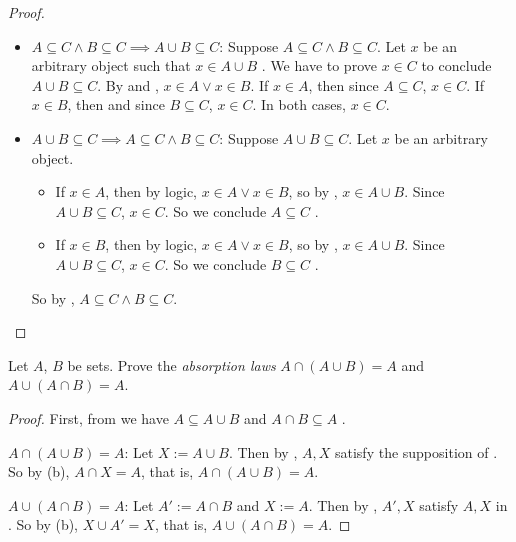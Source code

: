 \begin{proof}
\begin{itemize}
        \begin{itemize}
            \item \(A \subseteq C \land B \subseteq C \implies A \cup B \subseteq C\): Suppose \(A \subseteq C \land B \subseteq C\). Let \(x\) be an arbitrary object such that \(x \in A \cup B\) . We have to prove \(x \in C\) to conclude \(A \cup B \subseteq C\). By  and , \(x \in A \lor x \in B\). If \(x \in A\), then since \(A \subseteq C\), \(x \in C\). If \(x \in B\), then and since \(B \subseteq C\), \(x \in C\). In both cases, \(x \in C\).
            \item \(A \cup B \subseteq C \implies A \subseteq C \land B \subseteq C\): Suppose \(A \cup B \subseteq C\). Let \(x\) be an arbitrary object.
            \begin{itemize}
                \item If \(x \in A\), then by logic, \(x \in A \lor x \in B\), so by , \(x \in A \cup B\). Since \(A \cup B \subseteq C\), \(x \in C\). So we conclude \(A \subseteq C\) .
                \item If \(x \in B\), then by logic, \(x \in A \lor x \in B\), so by , \(x \in A \cup B\). Since \(A \cup B \subseteq C\), \(x \in C\). So we conclude \(B \subseteq C\) .
            \end{itemize}
            So by , \(A \subseteq C \land B \subseteq C\).
        \end{itemize}
\end{itemize}
\end{proof}

\begin{exercise}\label{exercise 3.1.8}
Let \(A\), \(B\) be sets. Prove the \emph{absorption laws} \(A \cap (A \cup B) = A\) and \(A \cup (A \cap B) = A\).
\end{exercise}

\begin{proof} First, from  we have \(A \subseteq A \cup B\)  and \(A \cap B \subseteq A\) .

\(A \cap (A \cup B) = A\): Let \(X := A \cup B\). Then by , \(A, X\) satisfy the supposition of .
So by (b), \(A \cap X = A\), that is, \(A \cap (A \cup B) = A\).

\(A \cup (A \cap B) = A\): Let \(A' := A \cap B\) and \(X := A\). Then by , \(A', X\) satisfy \(A, X\) in .
So by (b), \(X \cup A' = X\), that is, \(A \cup (A \cap B) = A\).
\end{proof}

